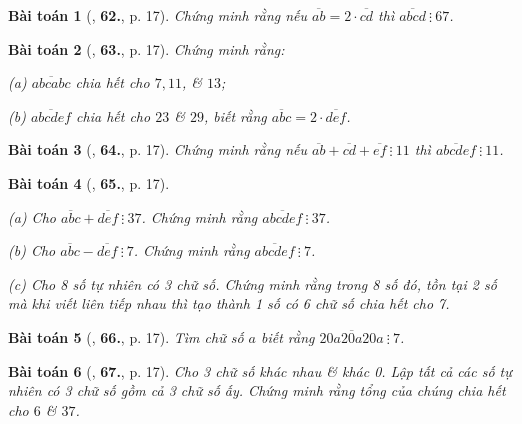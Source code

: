 \documentclass{article}
\numberwithin{equation}{section}
\newtheorem{baitoan}{Bài toán}[section]
\begin{document}
\begin{baitoan}[\cite{Binh_Toan_6_tap_1}, \textbf{62.}, p. 17]
	Chứng minh rằng nếu $\overline{ab} = 2\cdot\overline{cd}$ thì $\overline{abcd}\ \vdots\ 67$.
\end{baitoan}

\begin{baitoan}[\cite{Binh_Toan_6_tap_1}, \textbf{63.}, p. 17]
	Chứng minh rằng:
	\begin{enumerate*}
		\item[(a)] $\overline{abcabc}$ chia hết cho $7,11$, \& $13$;
		\item[(b)] $\overline{abcdef}$ chia hết cho $23$ \& $29$, biết rằng $\overline{abc} = 2\cdot\overline{def}$.
	\end{enumerate*}
\end{baitoan}

\begin{baitoan}[\cite{Binh_Toan_6_tap_1}, \textbf{64.}, p. 17]
	Chứng minh rằng nếu $\overline{ab} + \overline{cd} + \overline{ef}\ \vdots\ 11$ thì $\overline{abcdef}\ \vdots\ 11$.
\end{baitoan}

\begin{baitoan}[\cite{Binh_Toan_6_tap_1}, \textbf{65.}, p. 17]
	\begin{enumerate*}
		\item[(a)] Cho $\overline{abc} + \overline{def}\ \vdots\ 37$. Chứng minh rằng $\overline{abcdef}\ \vdots\ 37$.
		\item[(b)] Cho $\overline{abc} - \overline{def}\ \vdots\ 7$. Chứng minh rằng $\overline{abcdef}\ \vdots\ 7$.
		\item[(c)] Cho 8 số tự nhiên có 3 chữ số. Chứng minh rằng trong 8 số đó, tồn tại 2 số mà khi viết liên tiếp nhau thì tạo thành 1 số có 6 chữ số chia hết cho 7.
	\end{enumerate*}
\end{baitoan}

\begin{baitoan}[\cite{Binh_Toan_6_tap_1}, \textbf{66.}, p. 17]
	Tìm chữ số $a$ biết rằng $\overline{20a20a20a}\ \vdots\ 7$.
\end{baitoan}

\begin{baitoan}[\cite{Binh_Toan_6_tap_1}, \textbf{67.}, p. 17]
	Cho 3 chữ số khác nhau \& khác 0. Lập tất cả các số tự nhiên có 3 chữ số gồm cả 3 chữ số ấy. Chứng minh rằng tổng của chúng chia hết cho $6$ \& $37$.
\end{baitoan}
\end{document}
